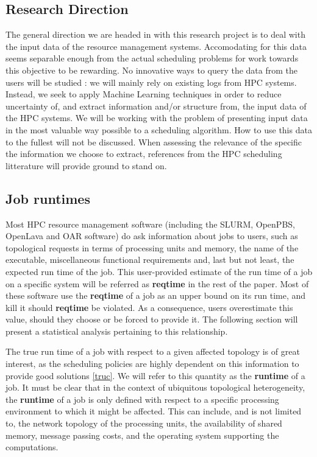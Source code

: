 \documentclass{article}
\begin{document}

\subsection{Research Direction}
The general direction we are headed in with this research project is to deal with the input data of the resource management systems.
Accomodating for this data seems separable enough from the actual scheduling problems for work towards this objective to be rewarding.
No innovative ways to query the data from the users will be studied : we will mainly rely on existing logs from HPC systems. Instead, we seek to apply Machine Learning techniques in order to reduce uncertainty of, and extract information and/or structure from, the input data of the HPC systems.
We will be working with the problem of presenting input data in the most valuable way possible to a scheduling algorithm. How to use this data to the fullest will not be discussed.
When assessing the relevance of the specific the information we choose to extract, references from the HPC scheduling litterature will provide ground to stand on.

\subsection{Job runtimes}
Most HPC resource management software (including the SLURM, OpenPBS, OpenLava and OAR software) do ask information about jobs to users, such as topological requests in terms of processing units and memory, the name of the executable, miscellaneous functional requirements and, last but not least, the expected run time of the job. This user-provided estimate of the run time of a job on a specific system will be referred as \textbf{reqtime} in the rest of the paper. Most of these software use the \textbf{reqtime} of a job as an upper bound on its run time, and kill it should \textbf{reqtime} be violated. As a consequence, users overestimate this value, should they choose or be forced to provide it. The following section will present a statistical analysis pertaining to this relationship.

The true run time of a job with respect to a given affected topology is of great interest, as the scheduling policies are highly dependent on this information to provide good solutions \ref{truc}. We will refer to this quantity as the \textbf{runtime} of a job.
It must be clear that in the context of ubiquitous topological heterogeneity, the \textbf{runtime} of a job is only defined with respect to a specific processing environment to which it might be affected.
This can include, and is not limited to, the network topology of the processing units, the availability of shared memory, message passing costs, and the operating system supporting the computations.
\end{document}
